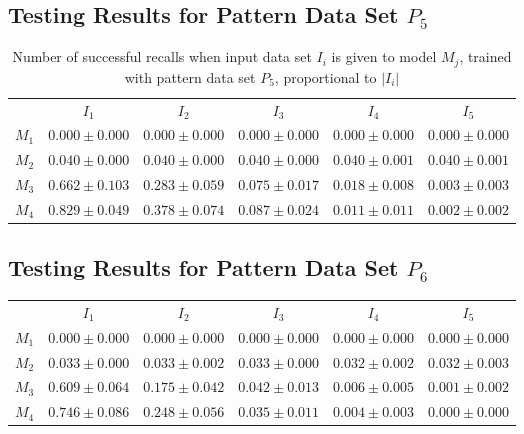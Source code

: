\documentclass[12pt]{article}
\begin{document}
\begin{appendices}
\subsection{Testing Results for Pattern Data Set $P_{5}$}


    \begin{table}[H]
    \centering
    \def\arraystretch{1.5}
    \footnotesize
    \begin{tabular}{cccccc}
    
 & $I_{1}$  & $I_{2}$  & $I_{3}$  & $I_{4}$  & $I_{5}$ \\ \cline{2-6}
$M_{1}$  & $0.000\pm0.000$  & $0.000\pm0.000$  & $0.000\pm0.000$  & $0.000\pm0.000$  & $0.000\pm0.000$ \\
$M_{2}$  & $0.040\pm0.000$  & $0.040\pm0.000$  & $0.040\pm0.000$  & $0.040\pm0.001$  & $0.040\pm0.001$ \\
$M_{3}$  & $0.662\pm0.103$  & $0.283\pm0.059$  & $0.075\pm0.017$  & $0.018\pm0.008$  & $0.003\pm0.003$ \\
$M_{4}$  & $0.829\pm0.049$  & $0.378\pm0.074$  & $0.087\pm0.024$  & $0.011\pm0.011$  & $0.002\pm0.002$ \\

    \end{tabular}
    \caption{Number of successful recalls when input data set $I_i$ is given to model $M_j$, trained with pattern data set $P_{5}$, proportional to $\left|I_i\right|$}
    \end{table}
    
\subsection{Testing Results for Pattern Data Set $P_{6}$}


    \begin{table}[H]
    \centering
    \def\arraystretch{1.5}
    \footnotesize
    \begin{tabular}{cccccc}
    
 & $I_{1}$  & $I_{2}$  & $I_{3}$  & $I_{4}$  & $I_{5}$ \\ \cline{2-6}
$M_{1}$  & $0.000\pm0.000$  & $0.000\pm0.000$  & $0.000\pm0.000$  & $0.000\pm0.000$  & $0.000\pm0.000$ \\
$M_{2}$  & $0.033\pm0.000$  & $0.033\pm0.002$  & $0.033\pm0.000$  & $0.032\pm0.002$  & $0.032\pm0.003$ \\
$M_{3}$  & $0.609\pm0.064$  & $0.175\pm0.042$  & $0.042\pm0.013$  & $0.006\pm0.005$  & $0.001\pm0.002$ \\
$M_{4}$  & $0.746\pm0.086$  & $0.248\pm0.056$  & $0.035\pm0.011$  & $0.004\pm0.003$  & $0.000\pm0.000$ \\


\end{tabular}
\end{table}
\end{appendices}
\end{document}
